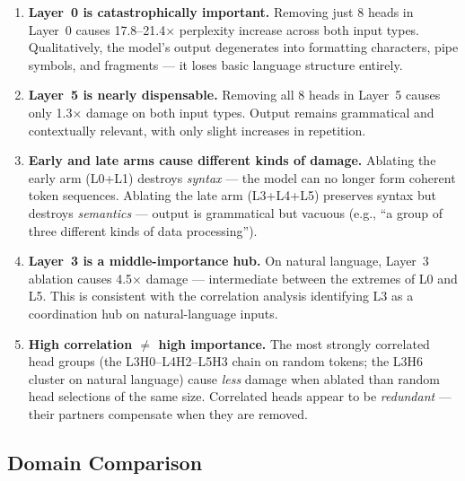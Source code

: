 \documentclass[11pt,a4paper]{article}
\begin{document}
\begin{enumerate}[itemsep=4pt]

    \item \textbf{Layer~0 is catastrophically important.}
    Removing just 8 heads in Layer~0 causes 17.8--21.4$\times$ perplexity increase across both input types.
    Qualitatively, the model's output degenerates into formatting characters, pipe symbols, and fragments --- it loses basic language structure entirely.

    \item \textbf{Layer~5 is nearly dispensable.}
    Removing all 8 heads in Layer~5 causes only 1.3$\times$ damage on both input types.
    Output remains grammatical and contextually relevant, with only slight increases in repetition.

    \item \textbf{Early and late arms cause different kinds of damage.}
    Ablating the early arm (L0+L1) destroys \emph{syntax} --- the model can no longer form coherent token sequences.
    Ablating the late arm (L3+L4+L5) preserves syntax but destroys \emph{semantics} --- output is grammatical but vacuous (e.g., ``a group of three different kinds of data processing'').

    \item \textbf{Layer~3 is a middle-importance hub.}
    On natural language, Layer~3 ablation causes 4.5$\times$ damage --- intermediate between the extremes of L0 and L5.
    This is consistent with the correlation analysis identifying L3 as a coordination hub on natural-language inputs.

    \item \textbf{High correlation $\neq$ high importance.}
    The most strongly correlated head groups (the L3H0--L4H2--L5H3 chain on random tokens; the L3H6 cluster on natural language) cause \emph{less} damage when ablated than random head selections of the same size.
    Correlated heads appear to be \emph{redundant} --- their partners compensate when they are removed.

\end{enumerate}

\subsection{Domain Comparison}
\label{sec:domain-results}
\end{document}
